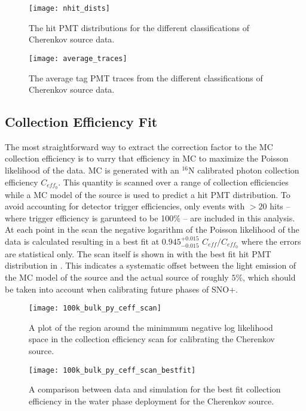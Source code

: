 \begin{figure}
\centering
\texttt{[image: nhit\_dists]}
\caption{\label{fig:chsrc_nhits} The hit PMT distributions for the different classifications of Cherenkov source data.}
\end{figure}


\begin{figure}
\centering
\texttt{[image: average\_traces]}
\caption{\label{fig:chsrc_pmttraces} The average tag PMT traces from the different classifications of Cherenkov source data.}
\end{figure}

\subsection{Collection Efficiency Fit}
The most straightforward way to extract the correction factor to the MC collection efficiency is to varry that efficiency in MC to maximize the Poisson likelihood of the data.
MC is generated with an $^16$N calibrated photon collection efficiency $C_{eff_0}$.
This quantity is scanned over a range of collection efficiencies while a MC model of the source is used to predict a hit PMT distribution.
To avoid accounting for detector trigger efficiencies, only events with $>20$ hits -- where trigger efficiency is garunteed to be 100$\%$ -- are included in this analysis.
At each point in the scan the negative logarithm of the Poisson likelihood of the data is calculated resulting in a best fit at $0.945^{+0.015}_{-0.015}$ $C_{eff}/C_{eff_0}$ where the errors are statistical only.
The scan itself is shown in  with the best fit hit PMT distribution in .
This indicates a systematic offset between the light emission of the MC model of the source and the actual source of roughly $5\%$, which should be taken into account when calibrating future phases of SNO+.

\begin{figure}
\centering
\texttt{[image: 100k\_bulk\_py\_ceff\_scan]}
\caption{\label{fig:chsrc_scan} A plot of the region around the minimmum negative log likelihood space in the collection efficiency scan for calibrating the Cherenkov source.}
\end{figure}

\begin{figure}
\centering
\texttt{[image: 100k\_bulk\_py\_ceff\_scan\_bestfit]}
\caption{\label{fig:chsrc_bestfit} A comparison between data and simulation for the best fit collection efficiency in the water phase deployment for the Cherenkov source.}
\end{figure}

